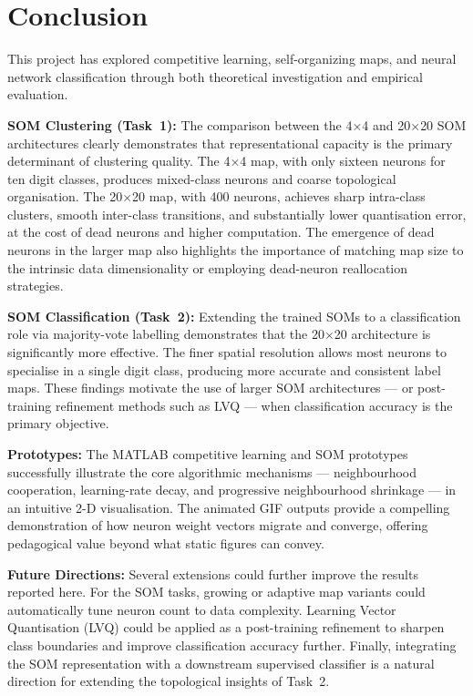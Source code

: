 \documentclass[12pt,a4paper]{report}
\begin{document}
\chapter{Conclusion}
\label{ch:conclusion}

This project has explored competitive learning, self-organizing maps, and neural network
classification through both theoretical investigation and empirical evaluation.

\textbf{SOM Clustering (Task~1):} The comparison between the 4$\times$4 and 20$\times$20
SOM architectures clearly demonstrates that representational capacity is the primary
determinant of clustering quality. The 4$\times$4 map, with only sixteen neurons for ten
digit classes, produces mixed-class neurons and coarse topological organisation. The
20$\times$20 map, with 400 neurons, achieves sharp intra-class clusters, smooth
inter-class transitions, and substantially lower quantisation error, at the cost of dead
neurons and higher computation. The emergence of dead neurons in the larger map also
highlights the importance of matching map size to the intrinsic data dimensionality or
employing dead-neuron reallocation strategies.

\textbf{SOM Classification (Task~2):} Extending the trained SOMs to a classification
role via majority-vote labelling demonstrates that the 20$\times$20 architecture is
significantly more effective. The finer spatial resolution allows most neurons to
specialise in a single digit class, producing more accurate and consistent label maps.
These findings motivate the use of larger SOM architectures — or post-training refinement
methods such as LVQ — when classification accuracy is the primary objective.

\textbf{Prototypes:} The MATLAB competitive learning and SOM prototypes successfully
illustrate the core algorithmic mechanisms — neighbourhood cooperation, learning-rate
decay, and progressive neighbourhood shrinkage — in an intuitive 2-D visualisation. The
animated GIF outputs provide a compelling demonstration of how neuron weight vectors
migrate and converge, offering pedagogical value beyond what static figures can convey.

\textbf{Future Directions:} Several extensions could further improve the results reported
here. For the SOM tasks, growing or adaptive map variants could automatically tune neuron
count to data complexity. Learning Vector Quantisation (LVQ) could be applied as a
post-training refinement to sharpen class boundaries and improve classification accuracy
further. Finally, integrating the SOM representation with a downstream supervised
classifier is a natural direction for extending the topological insights of Task~2.
\end{document}

